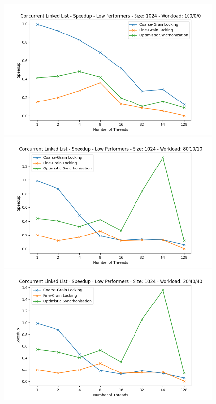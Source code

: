 \documentclass[../final_report.tex]{subfiles}
\begin{document}
\begin{figure}[H]
    \centering
        \includegraphics[scale=0.4]{outFiles/plots/concurrent_data_structs_low_speedup_1024_100_0_0.png}
        \includegraphics[scale=0.4]{outFiles/plots/concurrent_data_structs_low_speedup_1024_80_10_10.png}
        \includegraphics[scale=0.4]{outFiles/plots/concurrent_data_structs_low_speedup_1024_20_40_40.png}

\end{figure}
\end{document}
